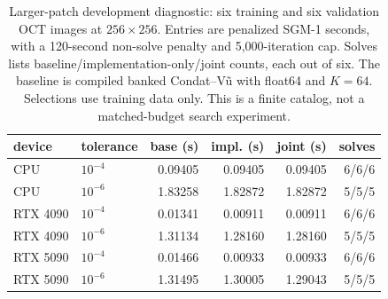\begin{table}[t]
\centering\small
\begin{tabular}{llrrrr}
\toprule
device & tolerance & base (s) & impl. (s) & joint (s) & solves \\
\midrule
CPU & $10^{-4}$ & 0.09405 & 0.09405 & 0.09405 & 6/6/6 \\
CPU & $10^{-6}$ & 1.83258 & 1.82872 & 1.82872 & 5/5/5 \\
RTX 4090 & $10^{-4}$ & 0.01341 & 0.00911 & 0.00911 & 6/6/6 \\
RTX 4090 & $10^{-6}$ & 1.31134 & 1.28160 & 1.28160 & 5/5/5 \\
RTX 5090 & $10^{-4}$ & 0.01466 & 0.00933 & 0.00933 & 6/6/6 \\
RTX 5090 & $10^{-6}$ & 1.31495 & 1.30005 & 1.29043 & 5/5/5 \\
\bottomrule
\end{tabular}
\caption{Larger-patch development diagnostic: six training and six validation OCT images at $256\times256$. Entries are penalized SGM-1 seconds, with a 120-second non-solve penalty and 5,000-iteration cap. Solves lists baseline/implementation-only/joint counts, each out of six. The baseline is compiled banked Condat--V\~u with float64 and $K=64$. Selections use training data only. This is a finite catalog, not a matched-budget search experiment.}
\label{tab:development-interaction}
\end{table}
